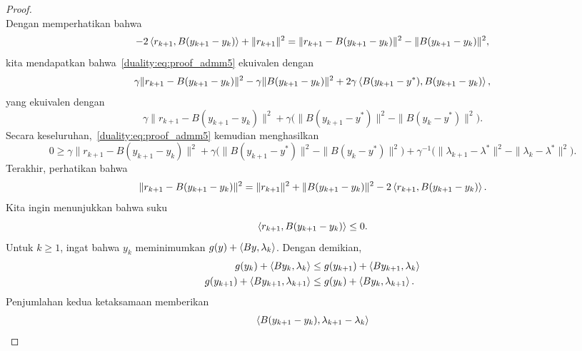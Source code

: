 \begin{proof}
\begin{equation}
    \end{equation}
    Dengan memperhatikan bahwa
    \begin{equation}
        -2\left\langle r_{k+1} , B(y_{k+1}-y_k)\right\rangle + \|r_{k+1}\|^2
        = \|r_{k+1} - B(y_{k+1}-y_k)\|^2 - \|B(y_{k+1}-y_k)\|^2,
    \end{equation}
    kita mendapatkan bahwa~\eqref{duality:eq:proof_admm5} ekuivalen dengan
    \begin{equation}
        \gamma \|r_{k+1} - B(y_{k+1}-y_k)\|^2 - \gamma\|B(y_{k+1}-y_k)\|^2 + 2\gamma\left\langle B(y_{k+1}-y^*) , B(y_{k+1}-y_k)\right\rangle,
    \end{equation}
    yang ekuivalen dengan
    \begin{equation}
        \gamma \|r_{k+1} - B(y_{k+1}-y_k)\|^2 + \gamma\big( \|B(y_{k+1}-y^*)\|^2 - \|B(y_{k}-y^*)\|^2\big).
    \end{equation}
    Secara keseluruhan,~\eqref{duality:eq:proof_admm5} kemudian menghasilkan
    {\small
    \begin{equation}
        0\geq \gamma \|r_{k+1} - B(y_{k+1}-y_k)\|^2 + \gamma\big( \|B(y_{k+1}-y^*)\|^2 - \|B(y_{k}-y^*)\|^2\big) + \gamma^{-1}\big(\|\lambda_{k+1}-\lambda^*\|^2 - \|\lambda_{k}-\lambda^*\|^2\big).
    \end{equation}
    }
    Terakhir, perhatikan bahwa
    \begin{equation}
        \|r_{k+1} - B(y_{k+1}-y_k)\|^2
        =\|r_{k+1}\|^2 + \|B(y_{k+1}-y_k)\|^2 - 2\left\langle r_{k+1} , B(y_{k+1}-y_k)\right\rangle.
    \end{equation}
    Kita ingin menunjukkan bahwa suku
    \begin{equation}
        \left\langle r_{k+1} , B(y_{k+1}-y_k)\right\rangle \leq 0.
    \end{equation}
    Untuk $k\geq 1$, ingat bahwa $y_k$ meminimumkan $g(y) + \left\langle By , \lambda_k\right\rangle$. Dengan demikian,
    \begin{equation}
        \begin{aligned}
            g(y_k) + \left\langle By_k , \lambda_k\right\rangle
            &\leq g(y_{k+1}) + \left\langle By_{k+1} , \lambda_k\right\rangle\\
            g(y_{k+1}) + \left\langle By_{k+1} , \lambda_{k+1}\right\rangle
            &\leq g(y_k) + \left\langle By_k , \lambda_{k+1}\right\rangle.
        \end{aligned}
    \end{equation}
    Penjumlahan kedua ketaksamaan memberikan
    \begin{equation}
        \begin{aligned}
            \inner{B(y_{k+1}-y_k)}{\lambda_{k+1}-\lambda_k}

\end{aligned}
\end{equation}
\end{proof}
